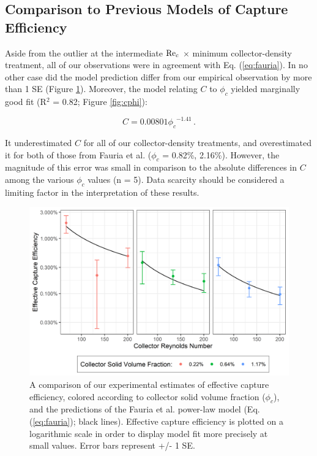 \documentclass[geosciences,article,submit,moreauthors,pdftex]{Definitions/mdpi}
\begin{document}
\subsection{Comparison to Previous Models of Capture Efficiency}

Aside from the outlier at the intermediate $\mathrm{Re}_c$ $\times$ minimum collector-density treatment, all of our observations were in agreement with Eq. (\ref{eq:fauria}). In no other case did the model prediction differ from our empirical observation by more than 1 SE (Figure \ref{fig:compplot}). Moreover, the model relating $C$ to $\phi_c$ yielded marginally good fit (R$^2$ = 0.82; Figure \ref{fig:cphi}):

\begin{equation}
    C = 0.00801{\phi_c}^{-1.41}\,.
    \label{eq:cphi}
\end{equation}

\noindent It underestimated $C$ for all of our collector-density treatments, and overestimated it for both of those from Fauria et al. ($\phi_c$ = 0.82\%, 2.16\%). However, the magnitude of this error was small in comparison to the absolute differences in $C$ among the various $\phi_c$ values (n = 5). Data scarcity should be considered a limiting factor in the interpretation of these results.

\begin{figure}[H]
\centering
\includegraphics[width=5in]{../pics/comparisonplot.png}
\caption{A comparison of our experimental estimates of effective capture efficiency, colored according to collector solid volume fraction ($\phi_c$), and the predictions of the Fauria et al. \cite{Fauria_2015} power-law model (Eq. (\ref{eq:fauria}); black lines). Effective capture efficiency is plotted on a logarithmic scale in order to display model fit more precisely at small values. Error bars represent +/- 1 SE.}
\label{fig:compplot}
\end{figure}   
\end{document}
